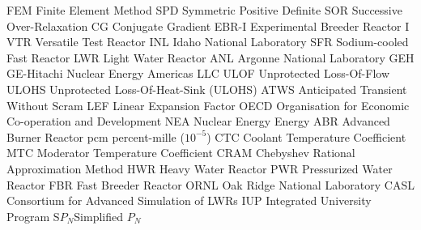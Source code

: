 \makeglossaries

   {FEM}   {Finite Element Method}
   {SPD}   {Symmetric Positive Definite}
   {SOR}   {Successive Over-Relaxation}
    {CG}    {Conjugate Gradient}
 {EBR-I} {Experimental Breeder Reactor I}
   {VTR}   {Versatile Test Reactor}
   {INL}   {Idaho National Laboratory}
   {SFR}   {Sodium-cooled Fast Reactor}
   {LWR}   {Light Water Reactor}
   {ANL}   {Argonne National Laboratory}
   {GEH}   {GE-Hitachi Nuclear Energy Americas LLC}
  {ULOF}  {Unprotected Loss-Of-Flow}
 {ULOHS} {Unprotected Loss-Of-Heat-Sink (ULOHS)}
  {ATWS}  {Anticipated Transient Without Scram}
   {LEF}   {Linear Expansion Factor}
  {OECD}  {Organisation for Economic Co-operation and Development}
   {NEA}   {Nuclear Energy Energy}
   {ABR}   {Advanced Burner Reactor}
   {pcm}   {percent-mille ($10^{-5}$)}
   {CTC}   {Coolant Temperature Coefficient}
   {MTC}   {Moderator Temperature Coefficient}
  {CRAM}  {Chebyshev Rational Approximation Method}
   {HWR}   {Heavy Water Reactor}
   {PWR}   {Pressurized Water Reactor}
   {FBR}   {Fast Breeder Reactor}
  {ORNL}  {Oak Ridge National Laboratory}
  {CASL}  {Consortium for Advanced Simulation of LWRs}
   {IUP}   {Integrated University Program}
   {S$P_N$}{Simplified $P_N$}
